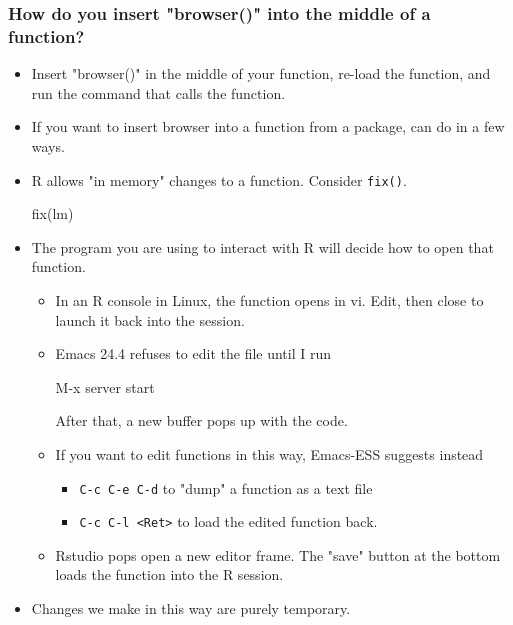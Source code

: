 \documentclass[10pt,english]{beamer}
\begin{document}
\begin{frame}
  \frametitle{How do you insert "browser()" into the middle of a function?}
  \begin{itemize}
    
  \item Insert "browser()" in the middle of your function, re-load the function,
    and run the command that calls the function.
    
  \item If you want to insert browser into a function from a package,
    can do in a few ways.
    
   \item R allows "in memory" changes to a function. Consider \texttt{fix()}.

     \begin{Schunk}
       \begin{Sinput}
fix(lm)
       \end{Sinput}
     \end{Schunk}

   \item The program you are using to interact with R will decide how to open that
     function.  
     \begin{itemize}
     \item In an R console in Linux, the
     function opens in vi. Edit, then close to launch it back into the session.
     \item Emacs 24.4 refuses to edit the file until I run
\begin{Sinput}       
M-x server start
\end{Sinput}       
      After that, a new buffer pops up with the code. 
    \item If you want to edit functions in this way, Emacs-ESS
      suggests instead
        \begin{itemize}
          \item \texttt{C-c C-e C-d}  to "dump"
             a function as a text file
          \item \texttt{C-c C-l <Ret>} to load the edited function back.
         \end{itemize}
         
     \item Rstudio pops open a new editor frame. The "save" button
       at the bottom loads the function into the R session.
      \end{itemize}
 \item Changes we make in this way are purely temporary.
 \end{itemize}
\end{frame}
\end{document}
